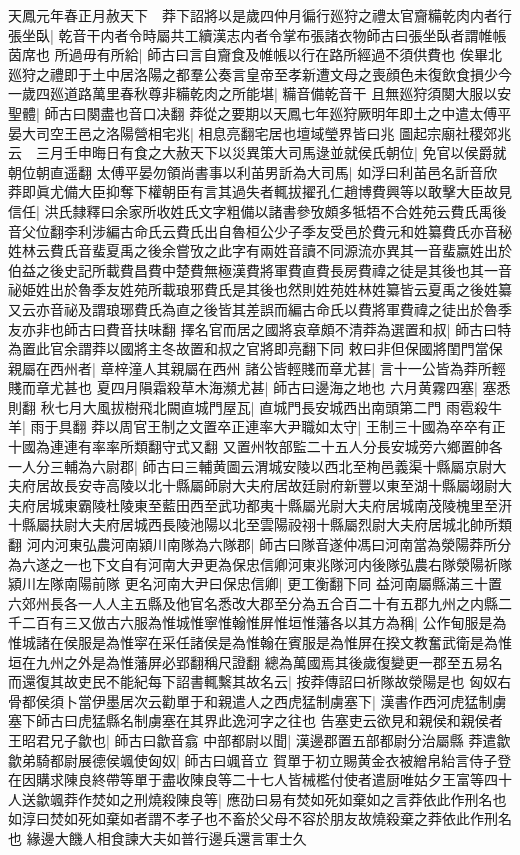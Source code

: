 天鳳元年春正月赦天下　莽下詔將以是歲四仲月徧行廵狩之禮太官齎糒乾肉内者行張坐臥|{
	乾音干内者令時屬共工續漢志内者令掌布張諸衣物師古曰張坐臥者謂帷帳茵席也}
所過毋有所給|{
	師古曰言自齎食及帷帳以行在路所經過不須供費也}
俟畢北廵狩之禮即于土中居洛陽之都羣公奏言皇帝至孝新遭文母之喪顔色未復飲食損少今一歲四廵道路萬里春秋尊非糒乾肉之所能堪|{
	糒音備乾音干}
且無廵狩須闋大服以安聖體|{
	師古曰闋盡也音口决翻}
莽從之要期以天鳳七年廵狩厥明年即土之中遣太傅平晏大司空王邑之洛陽營相宅兆|{
	相息亮翻宅居也壇域瑩界皆曰兆}
圖起宗廟社稷郊兆云　三月壬申晦日有食之大赦天下以災異策大司馬逯並就侯氏朝位|{
	免官以侯爵就朝位朝直遥翻}
太傅平晏勿領尚書事以利苖男訢為大司馬|{
	如浮曰利苖邑名訢音欣}
莽即眞尤備大臣抑奪下權朝臣有言其過失者輒拔擢孔仁趙博費興等以敢擊大臣故見信任|{
	洪氏隸釋曰余家所收姓氏文字粗備以諸書參攷頗多牴牾不合姓苑云費氏禹後音父位翻李利涉編古命氏云費氏出自魯桓公少子季友受邑於費元和姓纂費氏亦音秘姓林云費氏音蜚夏禹之後余嘗攷之此字有兩姓音讀不同源流亦異其一音蜚嬴姓出於伯益之後史記所載費昌費中楚費無極漢費將軍費直費長房費禕之徒是其後也其一音祕姫姓出於魯季友姓苑所載琅邪費氏是其後也然則姓苑姓林姓纂皆云夏禹之後姓纂又云亦音祕及謂琅琊費氏為直之後皆其差誤而編古命氏以費將軍費禕之徒出於魯季友亦非也師古曰費音扶味翻}
擇名官而居之國將哀章頗不清莽為選置和叔|{
	師古曰特為置此官余謂莽以國將主冬故置和叔之官將即亮翻下同}
敕曰非但保國將閨門當保親屬在西州者|{
	章梓潼人其親屬在西州}
諸公皆輕賤而章尤甚|{
	言十一公皆為莽所輕賤而章尤甚也}
夏四月隕霜殺草木海瀕尤甚|{
	師古曰邊海之地也}
六月黄霧四塞|{
	塞悉則翻}
秋七月大風拔樹飛北闕直城門屋瓦|{
	直城門長安城西出南頭第二門}
雨雹殺牛羊|{
	雨于具翻}
莽以周官王制之文置卒正連率大尹職如太守|{
	王制三十國為卒卒有正十國為連連有率率所類翻守式又翻}
又置州牧部監二十五人分長安城旁六鄉置帥各一人分三輔為六尉郡|{
	師古曰三輔黄圖云渭城安陵以西北至栒邑義渠十縣屬京尉大夫府居故長安寺高陵以北十縣屬師尉大夫府居故廷尉府新豐以東至湖十縣屬翊尉大夫府居城東霸陵杜陵東至藍田西至武功都夷十縣屬光尉大夫府居城南茂陵槐里至汧十縣屬扶尉大夫府居城西長陵池陽以北至雲陽祋祤十縣屬烈尉大夫府居城北帥所類翻}
河内河東弘農河南潁川南隊為六隊郡|{
	師古曰隊音遂仲馮曰河南當為滎陽莽所分為六遂之一也下文自有河南大尹更為保忠信卿河東兆隊河内後隊弘農右隊滎陽祈隊潁川左隊南陽前隊}
更名河南大尹曰保忠信卿|{
	更工衡翻下同}
益河南屬縣滿三十置六郊州長各一人人主五縣及他官名悉改大郡至分為五合百二十有五郡九州之内縣二千二百有三又倣古六服為惟城惟寧惟翰惟屏惟垣惟藩各以其方為稱|{
	公作甸服是為惟城諸在侯服是為惟寜在采任諸侯是為惟翰在賓服是為惟屏在揆文教奮武衛是為惟垣在九州之外是為惟藩屏必郢翻稱尺證翻}
總為萬國焉其後歲復變更一郡至五易名而還復其故吏民不能紀每下詔書輒繫其故名云|{
	按莽傳詔曰祈隊故滎陽是也}
匈奴右骨都侯須卜當伊墨居次云勸單于和親遣人之西虎猛制虜塞下|{
	漢書作西河虎猛制虜塞下師古曰虎猛縣名制虜塞在其界此逸河字之往也}
告塞吏云欲見和親侯和親侯者王昭君兄子歙也|{
	師古曰歙音翕}
中部都尉以聞|{
	漢邊郡置五部都尉分治屬縣}
莽遣歙歙弟騎都尉展德侯颯使匈奴|{
	師古曰颯音立}
賀單于初立賜黄金衣被繒帛紿言侍子登在因購求陳良終帶等單于盡收陳良等二十七人皆械檻付使者遣厨唯姑夕王富等四十人送歙颯莽作焚如之刑燒殺陳良等|{
	應劭曰易有焚如死如棄如之言莽依此作刑名也如淳曰焚如死如棄如者謂不孝子也不畜於父母不容於朋友故燒殺棄之莽依此作刑名也}
緣邊大饑人相食諫大夫如普行邊兵還言軍士久

